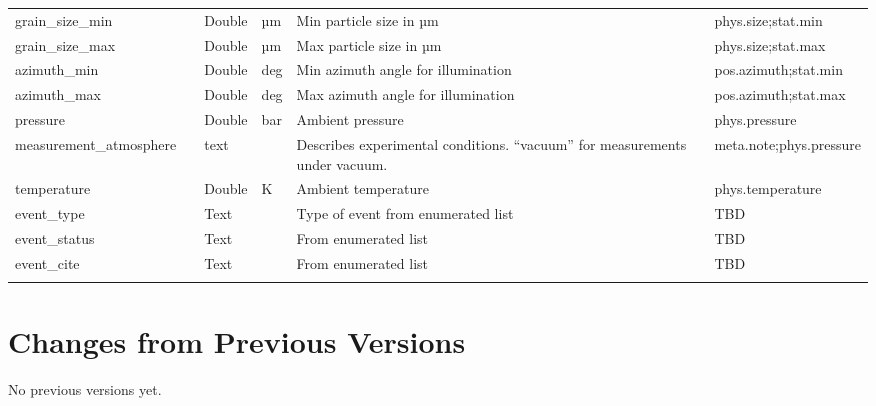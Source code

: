 \documentclass[11pt,a4paper]{ivoa}
\begin{document}
\begin{longtable}{p{3.5cm}p{0.5cm}p{1cm}p{1cm}p{7cm}p{3cm}}
grain\_size\_min&&Double&µm&Min particle size in µm&phys.size;stat.min\\

grain\_size\_max&&Double&µm&Max particle size in µm&phys.size;stat.max\\

azimuth\_min&&Double&deg&Min azimuth angle for illumination&pos.azimuth;stat.min\\

azimuth\_max&&Double&deg&Max azimuth angle for illumination&pos.azimuth;stat.max\\

pressure&&Double&bar&Ambient pressure&phys.pressure\\

measurement\_atmosphere&&text&&Describes experimental conditions. ``vacuum'' for measurements under vacuum.&meta.note;phys.pressure\\

temperature&&Double&K&Ambient temperature&phys.temperature\\

event\_type&&Text&&Type of event from enumerated list&TBD\\

event\_status&&Text&&From enumerated list&TBD\\

event\_cite&&Text&&From enumerated list&TBD\\

\sptablerule

\end{longtable}

\endgroup



\appendix
\section{Changes from Previous Versions}

No previous versions yet.  



\end{document}
